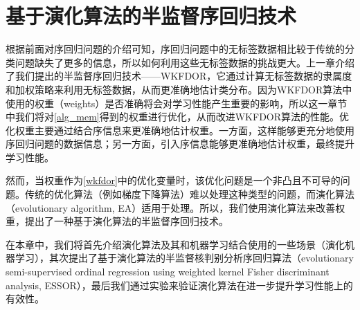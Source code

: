 \chapter{基于演化算法的半监督序回归技术}
\label{chap:essor}
根据前面对序回归问题的介绍可知，序回归问题中的无标签数据相比较于传统的分类问题缺失了更多的信息，所以如何利用这些无标签数据的挑战更大。上一章介绍了我们提出的半监督序回归技术——WKFDOR，它通过计算无标签数据的隶属度和加权策略来利用无标签数据，从而更准确地估计类分布。因为WKFDOR算法中使用的权重（weights）是否准确将会对学习性能产生重要的影响，所以这一章节中我们将对\autoref{alg_mem}得到的权重进行优化，从而改进WKFDOR算法的性能。优化权重主要通过结合序信息来更准确地估计权重。一方面，这样能够更充分地使用序回归问题的数据信息；另一方面，引入序信息能够更准确地估计权重，最终提升学习性能。

然而，当权重作为\autoref{wkfdor}中的优化变量时，该优化问题是一个非凸且不可导的问题。传统的优化算法（例如梯度下降算法）难以处理这种类型的问题，而演化算法（evolutionary algorithm, EA）适用于处理。所以，我们使用演化算法来改善权重，提出了一种基于演化算法的半监督序回归技术。

在本章中，我们将首先介绍演化算法及其和机器学习结合使用的一些场景（演化机器学习），其次提出了基于演化算法的半监督核判别分析序回归算法（evolutionary semi-supervised ordinal regression using weighted kernel Fisher discriminant analysis, ESSOR），最后我们通过实验来验证演化算法在进一步提升学习性能上的有效性。


